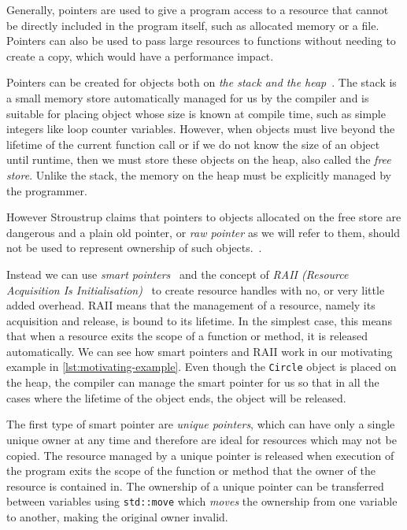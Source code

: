 \documentclass{mpaper}
\begin{document}
    Generally, pointers are used to give a program access to a resource that cannot be directly included in the program itself, such as allocated memory or a file.
    Pointers can also be used to pass large resources to functions without needing to create a copy, which would have a performance impact. 
    
    Pointers can be created for objects both on \emph{the stack and the heap}~\cite{Stroustrup2000}. 
    The stack is a small memory store automatically managed for us by the compiler and is suitable for placing object whose size is known at compile time, such as simple integers like loop counter variables.
    However, when objects must live beyond the lifetime of the current function call or if we do not know the size of an object until runtime, then we must store these objects on the heap, also called the \emph{free store}. 
    Unlike the stack, the memory on the heap must be explicitly managed by the programmer.
    
    However Stroustrup claims that pointers to objects allocated on the free store are dangerous and a plain old pointer, or \emph{raw pointer} as we will refer to them, should not be used to represent ownership of such objects.~\cite{Stroustrup2018}.

    Instead we can use \emph{smart pointers}~\cite{Dimov2003} and the concept of \emph{RAII (Resource Acquisition Is Initialisation)}~\cite{Stroustrup2000} to create resource handles with no, or very little added overhead.
    RAII means that the management of a resource, namely its acquisition and release, is bound to its lifetime. 
    In the simplest case, this means that when a resource exits the scope of a function or method, it is released automatically.
    We can see how smart pointers and RAII work in our motivating example in  \autoref{lst:motivating-example}.
    Even though the \texttt{Circle} object is placed on the heap, the compiler can manage the smart pointer for us so that in all the cases where the lifetime of the object ends, the object will be released. 

    The first type of smart pointer are \emph{unique pointers}, which can have only a single unique owner at any time and therefore are ideal for resources which may not be copied.
    The resource managed by a unique pointer is released when execution of the program exits the scope of the function or method that the owner of the resource is contained in.
    The ownership of a unique pointer can be transferred between variables using \texttt{std::move} which \emph{moves} the ownership from one variable to another, making the original owner invalid.
\end{document}
